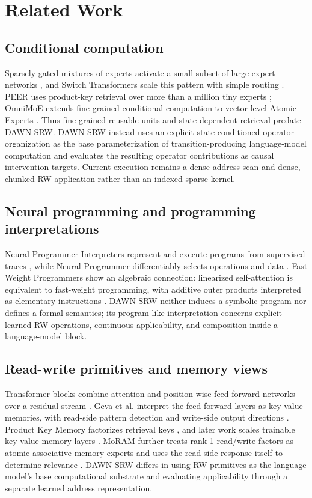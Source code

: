 \documentclass{article}
\newcommand{\DAWN}{DAWN-SRW}
\begin{document}
\section{Related Work}
\label{sec:related}

\subsection{Conditional computation}

Sparsely-gated mixtures of experts activate a small subset of large expert
networks \cite{shazeer2017outrageously}, and Switch Transformers scale this
pattern with simple routing \cite{fedus2022switch}. PEER uses product-key
retrieval over more than a million tiny experts \cite{he2024mixture}; OmniMoE
extends fine-grained conditional computation to vector-level Atomic Experts
\cite{shi2026omnimoe}. Thus fine-grained reusable units and state-dependent
retrieval predate \DAWN{}. \DAWN{} instead uses an explicit state-conditioned
operator organization as the base parameterization of transition-producing
language-model computation and evaluates the resulting operator contributions
as causal intervention targets. Current execution remains a dense address scan
and dense, chunked RW application rather than an indexed sparse kernel.

\subsection{Neural programming and programming interpretations}

Neural Programmer-Interpreters represent and execute programs from supervised
traces \cite{reed2016npi}, while Neural Programmer differentiably selects
operations and data \cite{neelakantan2016neuralprogrammer}. Fast Weight
Programmers show an algebraic connection: linearized self-attention is
equivalent to fast-weight programming, with additive outer products interpreted
as elementary instructions \cite{schlag2021linear}. \DAWN{} neither induces a
symbolic program nor defines a formal semantics; its program-like interpretation
concerns explicit learned RW operations, continuous applicability, and
composition inside a language-model block.

\subsection{Read-write primitives and memory views}

Transformer blocks combine attention and position-wise feed-forward networks
over a residual stream \cite{vaswani2017attention}. Geva et al. interpret the
feed-forward layers as key-value memories, with read-side pattern detection and
write-side output directions \cite{geva2021transformer}. Product Key Memory
factorizes retrieval keys \cite{lample2019large}, and later work scales
trainable key-value memory layers \cite{berges2024memory}. MoRAM further treats
rank-1 read/write factors as atomic associative-memory experts and uses the
read-side response itself to determine relevance \cite{lu2026little}.
\DAWN{} differs in using RW primitives as the language model's base
computational substrate and evaluating applicability through a separate
learned address representation.
\end{document}
